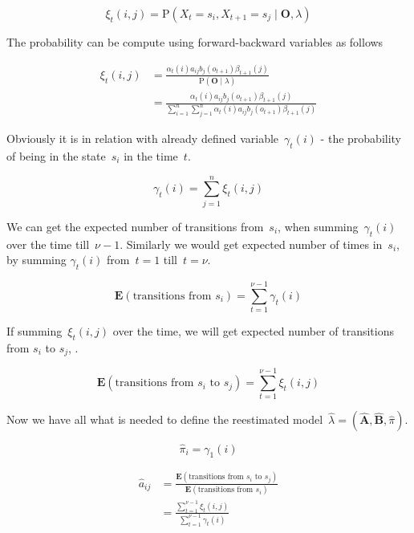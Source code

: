 \documentclass[thesis=M,english]{FITthesis}[2012/10/20]
\newcommand{\matr}[1]{\mathbf{#1}}
\begin{document}
\begin{equation}
\xi_t(i,j) = \mathrm{P}( X_t = s_i, X_{t+1} = s_j \mid \matr{O}, \lambda )  
\end{equation}

The probability can be compute using forward-backward variables as follows
 
\begin{equation}\label{eq:xi}
\begin{aligned}
\xi_t(i,j) &= \frac{ \alpha_t(i) a_{ij} b_j(o_{t+1}) \beta_{t+1}(j) }
		   		   { \mathrm{P}( \matr{O} \mid \lambda ) } \\
		   &= \frac{ \alpha_t(i) a_{ij} b_j(o_{t+1}) \beta_{t+1}(j) }
		   		   { \sum\limits_{i=1}^n \sum\limits_{j=1}^n \alpha_t(i) a_{ij} b_j(o_{t+1}) \beta_{t+1}(j) }
\end{aligned}
\end{equation}

Obviously it is in relation with already defined variable~$\gamma_t(i)$ - the probability of being in the state~$s_i$ in the time~$t$.

\begin{equation}
\gamma_t(i) = \sum_{j=1}^n \xi_t(i,j)  
\end{equation}

We can get the expected number of transitions from~$s_i$, when summing~$\gamma_t(i)$ over the time till~$\nu-1$. Similarly we would get expected number of times in~$s_i$, by summing $\gamma_t(i)$ from~$t=1$ till~$t=\nu$. 

\begin{equation}
\mathbf{E}(\text{transitions from $s_i$}) = \sum_{t=1}^{\nu-1} \gamma_t(i)  
\end{equation}

If summing~$\xi_t(i,j)$ over the time, we will get expected number of transitions from $s_i$ to $s_j$, . 

\begin{equation}
\mathbf{E}(\text{transitions from $s_i$ to $s_j$}) = \sum_{t=1}^{\nu-1} \xi_t(i,j)  
\end{equation}

Now we have all what is needed to define the reestimated model~$\hat\lambda=(\hat{\matr{A}},\hat{\matr{B}},\hat\pi)$.

\begin{equation}\label{eq:bwpi}
\hat\pi_i = \gamma_1(i)  
\end{equation}

\begin{equation}\label{eq:bwa}
\begin{aligned}
\hat a_{ij} &= \frac{\mathbf{E}(\text{transitions from $s_i$ to $s_j$})}
				   {\mathbf{E}(\text{transitions from $s_i$})}  \\
		    &= \frac{\sum\limits_{t=1}^{\nu-1} \xi_t(i,j)}{\sum\limits_{t=1}^{\nu-1} \gamma_t(i) }
\end{aligned}
\end{equation}
\end{document}
